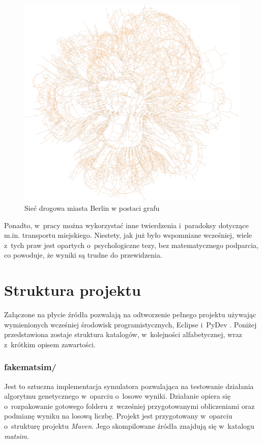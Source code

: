 \documentclass[twoside,12pt]{report}
\begin{document}
\begin{figure}[ht]
\centering
\includegraphics[width=\textwidth]{img/berlin2}
\caption{Sieć drogowa miasta Berlin w postaci grafu}
\label{berlin}
\end{figure}

Ponadto, w~pracy można wykorzystać inne twierdzenia i~paradoksy dotyczące m.in. transportu miejskiego. Niestety, jak już było wspomniane wcześniej, wiele z~tych praw jest opartych o~psychologiczne tezy, bez matematycznego podparcia, co powoduje, że wyniki są trudne do przewidzenia.

\section{Struktura projektu}

Załączone na płycie źródła pozwalają na odtworzenie pełnego projektu używając wymienionych wcześniej środowisk programistycznych, Eclipse \cite{eclipse} i~PyDev \cite{pydev}. Poniżej przedstawiona zostaje struktura katalogów, w~kolejności alfabetycznej, wraz z~krótkim opisem zawartości.

\subsubsection{fakematsim/}
Jest to sztuczna implementacja symulatora pozwalająca na testowanie działania algorytmu genetycznego w~oparciu o~losowe wyniki. Działanie opiera się o~rozpakowanie gotowego folderu z~wcześniej przygotowanymi obliczeniami oraz podmianę wyniku na losową liczbę. Projekt jest przygotowany w~oparciu o~strukturę projektu \textit{Maven}. Jego skompilowane źródła znajdują się  w~katalogu \textit{matsim}.
\end{document}
